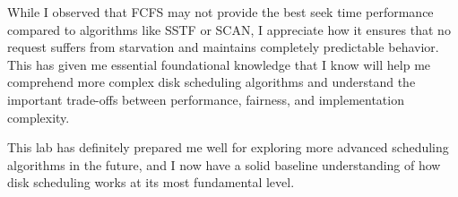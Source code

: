 \documentclass[12pt,a4paper]{article}
\begin{document}
While I observed that FCFS may not provide the best seek time performance compared to algorithms like SSTF or SCAN, I appreciate how it ensures that no request suffers from starvation and maintains completely predictable behavior. This has given me essential foundational knowledge that I know will help me comprehend more complex disk scheduling algorithms and understand the important trade-offs between performance, fairness, and implementation complexity.

This lab has definitely prepared me well for exploring more advanced scheduling algorithms in the future, and I now have a solid baseline understanding of how disk scheduling works at its most fundamental level.
\end{document}
